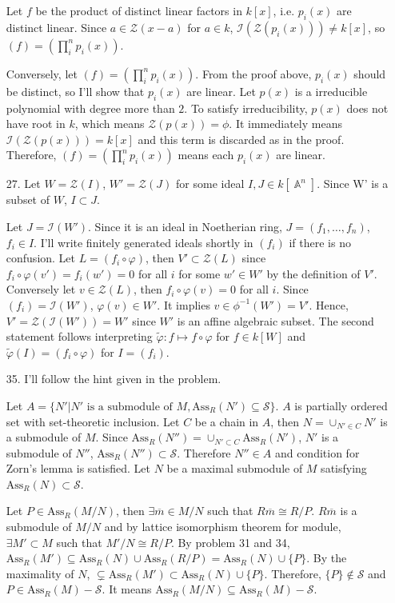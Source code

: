 \documentclass[12pt]{article}
\DeclareMathOperator{\bA}{\mathbb{A}}
\newcommand{\Ass}{\text{Ass}_R}
\newcommand{\I}{\mathcal{I}}
\newcommand{\Z}{\mathcal{Z}}
\begin{document}
\begin{enumerate}
Let $f$ be the product of distinct linear factors in $k[x]$, i.e. $p_i(x)$ are distinct linear. Since $a\in \Z(x-a)$ for $a\in k$, $\I(\Z(p_i(x)))\neq k[x]$, so $(f)=(\prod_i^n p_i(x))$.

Conversely, let $(f)=(\prod_i^n p_i(x))$. From the proof above, $p_i(x)$ should be distinct, so I'll show that $p_i(x)$ are linear. Let $p(x)$ is a irreducible polynomial with degree more than $2$. To satisfy irreducibility, $p(x)$ does not have root in $k$, which means $\Z(p(x))=\phi$. It immediately means $\I(\Z(p(x)))=k[x]$ and this term is discarded as in the proof. Therefore, $(f)=(\prod_i^n p_i(x))$ means each $p_i(x)$ are linear.

\item[27.] Let $W=\Z(I)$, $W'=\Z(J)$ for some ideal $I,J\in k[\bA^n]$. Since W' is a subset of $W$, $I\subset J$.

Let $J=\I(W')$. Since it is an ideal in Noetherian ring, $J=(f_1, \ldots, f_n)$, $f_i\in I$. I'll write finitely generated ideals shortly in $(f_i)$ if there is no confusion. Let $L=(f_i\circ \varphi)$, then $V'\subset \Z(L)$ since $f_i\circ\varphi(v')=f_i(w')=0$ for all $i$ for some $w'\in W'$ by the definition of $V'$. Conversely let $v\in \Z(L)$, then $f_i\circ\varphi(v)=0$ for all $i$. Since $(f_i)=\I(W')$, $\varphi(v)\in W'$. It implies $v\in \phi^{-1}(W')=V'$. Hence, $V'=\Z\left(\I(W')\right)=W'$ since $W'$ is an affine algebraic subset. The second statement follows interpreting $\tilde{\varphi}:f\mapsto f\circ \varphi$ for $f\in k[W]$ and $\tilde{\varphi}(I)=(f_i\circ \varphi)$ for $I=(f_i)$.
\item[35.] I'll follow the hint given in the problem.

Let $A=\{N'|N'\text{ is a submodule of }M,\text{Ass}_R(N')\subseteq \mathcal{S}\}$. $A$ is partially ordered set with set-theoretic inclusion. Let $C$ be a chain in $A$, then $N=\cup_{N'\in C}N'$ is a submodule of $M$. Since $\Ass(N'')=\cup_{N'\subset C}\Ass(N')$, $N'$ is a submodule of $N''$, $\Ass(N'')\subset \mathcal{S}$. Therefore $N''\in A$ and condition for Zorn's lemma is satisfied. Let $N$ be a maximal submodule of $M$ satisfying $\Ass(N)\subset \mathcal{S}$.

Let $P\in \Ass(M/N)$, then $\exists \overline{m}\in M/N$ such that $R\overline{m}\cong R/P$. $R\overline{m}$ is a submodule of $M/N$ and by lattice isomorphism theorem for module, $\exists M'\subset M$ such that $M'/N\cong R/P$. By problem 31 and 34, $\Ass(M')\subseteq \Ass(N)\cup \Ass(R/P)=\Ass(N)\cup \{P\}$. By the maximality of $N$, $\subsetneq\Ass(M')\subset \Ass(N)\cup \{P\}$. Therefore, $\{P\}\notin \mathcal{S}$ and $P\in \Ass(M)-\mathcal{S}$. It means $\Ass(M/N)\subseteq \Ass(M)-\mathcal{S}$.


\end{enumerate}
\end{document}
